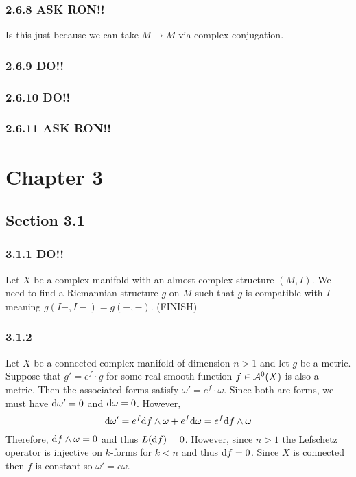 \documentclass[12pt]{article}
\begin{document}
\subsubsection{2.6.8 ASK RON!!}

Is this just because we can take $M \to M$ via complex conjugation.

\subsubsection{2.6.9 DO!!}

\subsubsection{2.6.10 DO!!}

\subsubsection{2.6.11 ASK RON!!}

\section{Chapter 3}

\subsection{Section 3.1}

\subsubsection{3.1.1 DO!!}

Let $X$ be a complex manifold with an almost complex structure $(M, I)$. We need to find a Riemannian structure $g$ on $M$ such that $g$ is compatible with $I$ meaning $g(I-,I-) = g(-,-)$.
(FINISH)

\subsubsection{3.1.2}

Let $X$ be a connected complex manifold of dimension $n > 1$ and let $g$ be a \kahler metric. Suppose that $g' = e^f \cdot g$ for some real smooth function $f \in \mathcal{A}^0(X)$ is also a \kahler metric. Then the associated \kahler forms satisfy $\omega' = e^f \cdot \omega$. Since both are \kahler forms, we must have $\mathrm{d}{\omega'} = 0$  and $\mathrm{d}{\omega} = 0$. However, 
\[ \mathrm{d}{\omega'} = e^f \mathrm{d}{f} \wedge \omega + e^f \mathrm{d}{\omega} = e^f \mathrm{d}{f} \wedge \omega \]
Therefore, $\mathrm{d}{f} \wedge \omega = 0$ and thus $L(\mathrm{d}{f}) = 0$. However, since $n > 1$ the Lefschetz operator is injective on $k$-forms for $k < n$ and thus $\mathrm{d}{f} = 0$. Since $X$ is connected then $f$ is constant so $\omega' = c \omega$.
\end{document}
